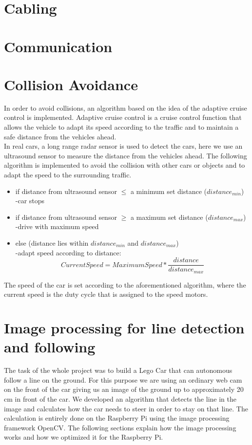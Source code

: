 \documentclass[11pt,twocolumn]{article}
\begin{document}
\section{Cabling}

\section{Communication}

\section{Collision Avoidance}
In order to avoid collisions, an algorithm based on the idea of the adaptive cruise control is implemented. Adaptive cruise control is a cruise control function that allows the vehicle to adapt its speed according to the traffic and to maintain a safe distance from the vehicles ahead.\\
In real cars, a long range radar sensor is used to detect the cars, here we use an ultrasound sensor to measure the distance from the vehicles ahead. The following algorithm is implemented to avoid the collision with other cars or objects and to adapt the speed to the surrounding traffic.
\begin{itemize}
	\item if distance from ultrasound sensor $\leq$ a minimum set distance ($distance_{min}$)\\
	-car stops
	\item if distance from ultrasound sensor $\geq$ a maximum set distance ($distance_{max}$)\\
	 -drive with maximum speed
	\item else (distance lies within $distance_{min}$ and $distance_{max}$)\\
	 -adapt speed according to distance:
	 \begin{equation}
	 Current Speed = Maximum Speed * \frac{distance}{distance_{max}}
	 \end{equation}
\end{itemize}

The speed of the car is set according to the aforementioned algorithm, where the current speed is the duty cycle that is assigned to the speed motors.
\section{Image processing for line detection and following}
The task of the whole project was to build a Lego Car that can autonomous follow a line on the ground. For this purpose we are using an ordinary web cam on the front of the car giving us an image of the ground up to approximately 20 cm in front of the car. We developed an algorithm that detects the line in the image and calculates how the car needs to steer in order to stay on that line. The calculation is entirely done on the Raspberry Pi using the image processing framework OpenCV. The following sections explain how the image processing works and how we optimized it for the Raspberry Pi.
\end{document}
